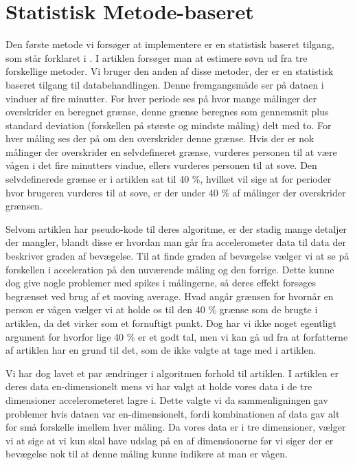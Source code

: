 \section{Statistisk Metode-baseret}\label{sec:statMet}
Den første metode vi forsøger at implementere er en statistisk baseret tilgang, som står forklaret i \citet{gautam2014smartphone}.
I artiklen forsøger man at estimere søvn ud fra tre forskellige metoder.
Vi bruger den anden af disse metoder, der er en statistisk baseret tilgang til databehandlingen.
Denne fremgangsmåde ser på dataen i vinduer af fire minutter.
For hver periode ses på hvor mange målinger der overskrider en beregnet grænse, denne grænse beregnes som gennemsnit plus standard deviation (forskellen på største og mindste måling) delt med to.
For hver måling ses der på om den overskrider denne grænse.
Hvis der er nok målinger der overskrider en selvdefineret grænse, vurderes personen til at være vågen i det fire minutters vindue, ellers vurderes personen til at sove.
Den selvdefinerede grænse er i artiklen sat til 40 \%, hvilket vil sige at for perioder hvor brugeren vurderes til at sove, er der under 40 \% af målinger der overskrider grænsen.

Selvom artiklen har pseudo-kode til deres algoritme, er der stadig mange detaljer der mangler, blandt disse er hvordan man går fra accelerometer data til data der beskriver graden af bevægelse.
Til at finde graden af bevægelse vælger vi at se på forskellen i acceleration på den nuværende måling og den forrige.
Dette kunne dog give nogle problemer med spikes i målingerne, så deres effekt forsøges begrænset ved brug af et moving average.
Hvad angår grænsen for hvornår en person er vågen vælger vi at holde os til den 40 \% grænse som de brugte i artiklen, da det virker som et fornuftigt punkt.
Dog har vi ikke noget egentligt argument for hvorfor lige 40 \% er et godt tal, men vi kan gå ud fra at forfatterne af artiklen har en grund til det, som de ikke valgte at tage med i artiklen.

Vi har dog lavet et par ændringer i algoritmen forhold til artiklen.
I artiklen er deres data en-dimensionelt mens vi har valgt at holde vores data i de tre dimensioner accelerometeret lagre i.
Dette valgte vi da sammenligningen gav problemer hvis dataen var en-dimensionelt, fordi kombinationen af data gav alt for små forskelle imellem hver måling.
Da vores data er i tre dimensioner, vælger vi at sige at vi kun skal have udslag på en af dimensionerne før vi siger der er bevægelse nok til at denne måling kunne indikere at man er vågen.

